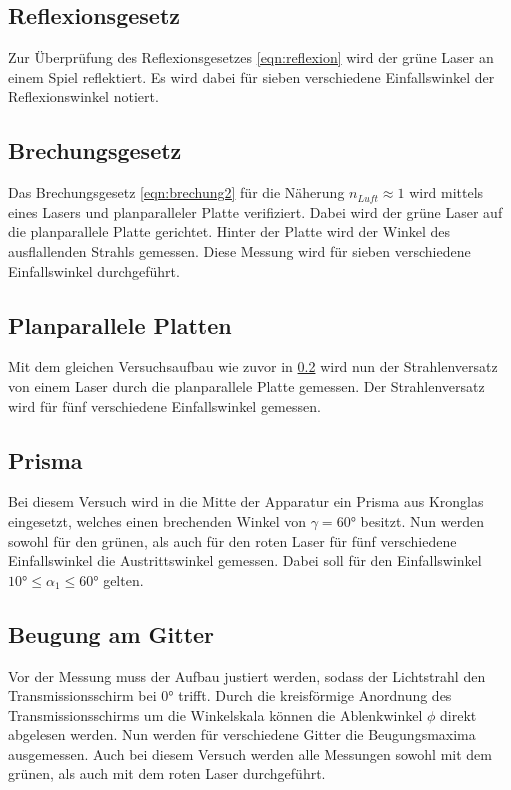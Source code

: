 \subsection{Reflexionsgesetz}
\label{sec:reflexionsmessung}
Zur Überprüfung des Reflexionsgesetzes \ref{eqn:reflexion} wird der grüne Laser an einem Spiel reflektiert. Es wird dabei für 
sieben verschiedene Einfallswinkel der Reflexionswinkel notiert. 

\subsection{Brechungsgesetz}
\label{sec:brechungmessung}
Das Brechungsgesetz \ref{eqn:brechung2} für die Näherung $n_{Luft}\approx1$ wird mittels eines Lasers und planparalleler Platte 
verifiziert. Dabei wird der grüne Laser auf die planparallele Platte gerichtet. Hinter der Platte wird der Winkel des ausflallenden
Strahls gemessen. Diese Messung wird für sieben verschiedene Einfallswinkel durchgeführt.

\subsection{Planparallele Platten}
\label{sec:planplattemessung}
Mit dem gleichen Versuchsaufbau wie zuvor in \ref{sec:brechungmessung} wird nun der Strahlenversatz von einem Laser durch die 
planparallele Platte gemessen. Der Strahlenversatz wird für fünf verschiedene Einfallswinkel gemessen. 

\subsection{Prisma}
\label{sec:prismamessung}
Bei diesem Versuch wird in die Mitte der Apparatur ein Prisma aus Kronglas eingesetzt, welches einen brechenden Winkel von 
$\gamma=60°$ besitzt. Nun werden sowohl für den grünen, als auch für den roten Laser für fünf verschiedene Einfallswinkel
die Austrittswinkel gemessen. Dabei soll für den Einfallswinkel $10°\leq\alpha_1\leq 60°$ gelten. 

\subsection{Beugung am Gitter}
\label{sec:beugungmessung}
Vor der Messung muss der Aufbau justiert werden, sodass der Lichtstrahl den Transmissionsschirm bei $0°$ trifft. Durch die 
kreisförmige Anordnung des Transmissionsschirms um die Winkelskala können die Ablenkwinkel $\phi$ direkt abgelesen werden.
Nun werden für verschiedene Gitter die Beugungsmaxima ausgemessen.
Auch bei diesem Versuch werden alle Messungen sowohl mit dem grünen, als auch mit dem roten Laser durchgeführt.